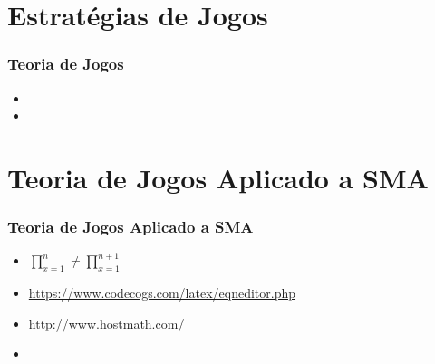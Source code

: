 

\section{Estratégias de Jogos}
\begin{frame}

    \frametitle{Teoria de Jogos}
    \begin{itemize}
    \pause
      \item 
\pause
      \item 
    
    \end{itemize}
\end{frame}





\section{Teoria de Jogos Aplicado a SMA}
\begin{frame}

    \frametitle{Teoria de Jogos Aplicado a SMA}
    \begin{itemize}
    \pause
      \item $\prod^{n}_{x=1} \neq  \prod_{x=1}^{n+1}$
      \item  \url{https://www.codecogs.com/latex/eqneditor.php}
      \item \url{http://www.hostmath.com/}
      

      \pause
      \item 
    
    \end{itemize}
\end{frame}

